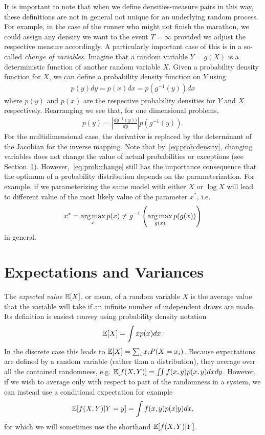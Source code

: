 It is important to note that when we define densities-measure pairs in this way, these 
definitions are not in general not unique for an underlying random process.  For example, 
in the case of the runner who might not finish the marathon, we could assign any density 
we want to the event $T=\infty$ provided we adjust the respective measure accordingly.
A particularly important case of this is in a so-called \emph{change of variables}.  Imagine
that a random variable $Y=g(X)$ is a deterministic function of another random variable $X$.
Given a probability density function for $X$, we can define a probability density function
on $Y$ using
\begin{align}
\label{eq:prob:change}
p(y)dy = p(x)dx = p(g^{-1}(y))dx
\end{align} 
where $p(y)$ and $p(x)$ are the respective probability densities for $Y$ and $X$
respectively.  Rearranging we see that, for one dimensional problems, 
\begin{align}
\label{eq:prob:change2}
p(y) = \left|\frac{dg^{-1}(y))}{dy}\right|p(g^{-1}(y)).
\end{align}
For the multidimensional case, the derivative is replaced by the determinant of the
Jacobian for the inverse mapping.  Note that by~\eqref{eq:prob:density}, changing
variables does not change the value of actual probabilities or exceptions (see
 Section~\ref{sec:prob:expt}).  However,~\eqref{eq:prob:change}
still has the importance consequence that the optimum of a probability distribution
depends on the parameterization.  For example, if we parameterizing the same model with
either $X$ or $\log X$ will lead to different value of the most likely value of the parameter
$x^*$, i.e.
\begin{align}
x^* = \operatorname*{arg\,max}_{x} p(x) \neq g^{-1} \left(\operatorname*{arg\,max}_{g(x)} p(g(x))\right)
\end{align}
in general.

\section{Expectations and Variances}
\label{sec:prob:expt}

The \emph{expected value} $\mathbb{E} [X]$, or mean, of a random variable $X$ is the average value that the variable
will take if an infinite number of independent draws are made.  Its definition is easiest convey using 
probability density notation
\begin{align}
\label{eq:prob:expt}
\mathbb{E} [X] = \int x p(x)dx.
\end{align}
In the discrete case this leads to $\mathbb{E} [X] = \sum_{i} x_i P(X=x_i)$.  Because expectations are defined by a random
variable (rather than a distribution), they
average over all the contained randomness, e.g. $\mathbb{E} [f(X,Y)]=\iint f(x,y) p(x,y)dxdy$.  However, if we
wish to average only with respect to part of the randomness in a system, we can instead use a conditional
expectation for example
\begin{align}
\label{eq:prob:cond-expt}
\mathbb{E} [f(X,Y) | Y=y] = \int f(x,y) p(x|y) dx,
\end{align}
for which we will sometimes use the shorthand $\mathbb{E} [f(X,Y) | Y]$.


